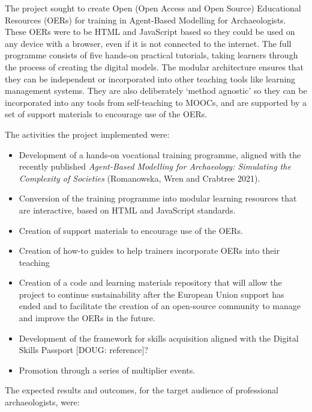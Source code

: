 \documentclass[
]{article}
\begin{document}
The project sought to create Open (Open Access and Open Source) Educational Resources (OERs) for training in Agent-Based Modelling for Archaeologists. These OERs were to be HTML and JavaScript based so they could be used on any device with a browser, even if it is not connected to the internet. The full programme consists of five hands-on practical tutorials, taking learners through the process of creating the digital models. The modular architecture ensures that they can be independent or incorporated into other teaching tools like learning management systems. They are also deliberately `method agnostic' so they can be incorporated into any tools from self-teaching to MOOCs, and are supported by a set of support materials to encourage use of the OERs.

The activities the project implemented were:

\begin{itemize}
\item
  Development of a hands-on vocational training programme, aligned with the recently published \emph{Agent-Based Modelling for Archaeology: Simulating the Complexity of Societies} (Romanowska, Wren and Crabtree 2021).
\item
  Conversion of the training programme into modular learning resources that are interactive, based on HTML and JavaScript standards.
\item
  Creation of support materials to encourage use of the OERs.
\item
  Creation of how-to guides to help trainers incorporate OERs into their teaching
\item
  Creation of a code and learning materials repository that will allow the project to continue sustainability after the European Union support has ended and to facilitate the creation of an open-source community to manage and improve the OERs in the future.
\item
  Development of the framework for skills acquisition aligned with the Digital Skills Passport {[}DOUG: reference{]}?
\item
  Promotion through a series of multiplier events.
\end{itemize}

The expected results and outcomes, for the target audience of professional archaeologists, were:
\end{document}

